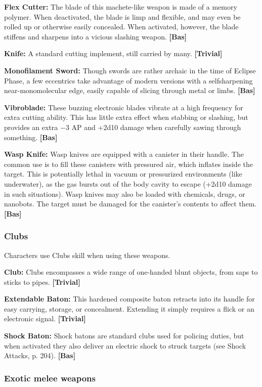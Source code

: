 {{\textbf{Flex Cutter:} The blade of this machete-like weapon is made of a memory polymer. When deactivated, the blade is limp and flexible, and may even be rolled up or otherwise easily concealed. When activated, however, the blade stiffens and sharpens into a vicious slashing weapon. \textbf{[Bas]} 

\textbf{Knife:} A standard cutting implement, still carried by many. \textbf{[Trivial]} 

\textbf{Monofilament Sword:} Though swords are rather archaic in the time of Eclipse Phase, a few eccentrics take advantage of modern versions with a selfsharpening near-monomolecular edge, easily capable of slicing through metal or limbs. \textbf{[Bas]} 

\textbf{Vibroblade:} These buzzing electronic blades vibrate at a high frequency for extra cutting ability. This has little extra effect when stabbing or slashing, but provides an extra $-$3 AP and +2d10 damage when carefully sawing through something. \textbf{[Bas]} 

\textbf{Wasp Knife:} Wasp knives are equipped with a canister in their handle. The common use is to fill these canisters with pressured air, which inflates inside the target. This is potentially lethal in vacuum or pressurized environments (like underwater), as the gas bursts out of the body cavity to escape (+2d10 damage in such situations). Wasp knives may also be loaded with chemicals, drugs, or nanobots. The target must be damaged for the canister’s contents to affect them. \textbf{[Bas]} 

\subsubsection{Clubs} 

Characters use Clubs skill when using these weapons. 

\textbf{Club:} Clubs encompasses a wide range of one-handed blunt objects, from saps to sticks to pipes. \textbf{[Trivial]} 

\textbf{Extendable Baton:} This hardened composite baton retracts into its handle for easy carrying, storage, or concealment. Extending it simply requires a flick or an electronic signal. \textbf{[Trivial]} 

\textbf{Shock Baton:} Shock batons are standard clubs used for policing duties, but when activated they also deliver an electric shock to struck targets (see Shock Attacks, p. 204). \textbf{[Bas]} 

\subsubsection{Exotic melee weapons} 

}}
